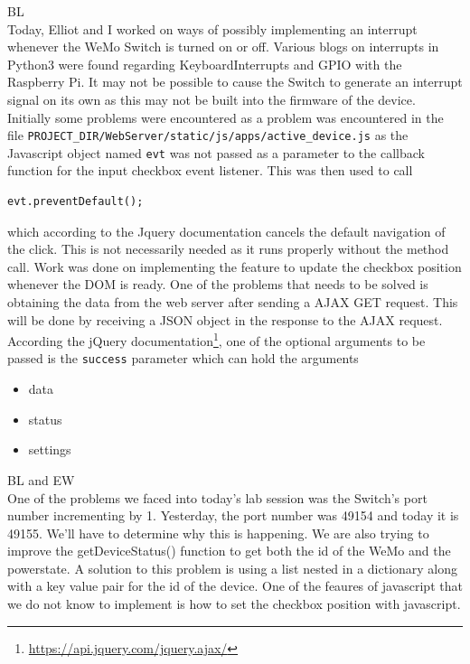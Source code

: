 \documentclass[fontsize=11pt, %
                             paper=letter, %
                             openany, %
                             captions=tableheading,
                             index=totoc,
                             hyperref]{labbook}
\begin{document}
BL\\
Today, Elliot and I worked on ways of possibly implementing an interrupt whenever the WeMo Switch is turned on or off. Various blogs on interrupts in Python3 were found regarding KeyboardInterrupts and GPIO with the Raspberry Pi. It may not be possible to cause the Switch to generate an interrupt signal on its own as this may not be built into the firmware of the device. Initially some problems were encountered as a problem was encountered in the file \texttt{PROJECT\_DIR/WebServer/static/js/apps/active\_device.js} as the Javascript object named \texttt{evt} was not passed as a parameter to the callback function for the input checkbox event listener. This was then used to call
\begin{Verbatim}
evt.preventDefault();
\end{Verbatim}
which according to the Jquery documentation cancels the default navigation of the click. This is not necessarily needed as it runs properly without the method call. Work was done on implementing the feature to update the checkbox position whenever the DOM is ready. One of the problems that needs to be solved is obtaining the data from the web server after sending a AJAX GET request. This will be done by receiving a JSON object in the response to the AJAX request. According the jQuery documentation\footnote{\url{https://api.jquery.com/jquery.ajax/}}, one of the optional arguments to be passed is the \texttt{success} parameter which can hold the arguments
\begin{itemize}
\item data
\item status
\item settings
\end{itemize}

BL and EW\\
One of the problems we faced into today's lab session was the Switch's port number incrementing by 1. Yesterday, the port number was 49154 and today it is 49155. We'll have to determine why this is happening.
We are also trying to improve the getDeviceStatus() function to get both the id of the WeMo and the powerstate. A solution to this problem is using a list nested in a dictionary along with a key value pair for the id of the device. One of the feaures of javascript that we do not know to implement is how to set the checkbox position with javascript.
\end{document}
